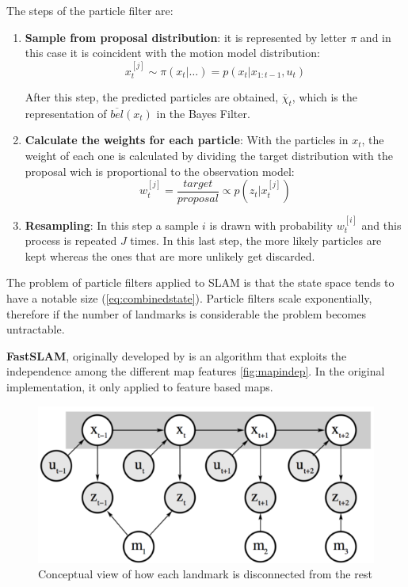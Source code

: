 The steps of the particle filter are:
\begin{enumerate}
  \item \textbf{Sample from proposal distribution}: it is represented by letter $\pi$ and in this case it is coincident with the motion model distribution:
  \begin{equation}
    x_t^{[j]} \sim \pi(x_t|\ldots) = p(x_t|x_{1:t-1}, u_t) 
    \label{eq:pfmotion}
  \end{equation}  

  After this step, the predicted particles are obtained, $\overline{\chi}_t$, which is the representation of $\overline{bel}(x_t)$ in the Bayes Filter.

  \item \textbf{Calculate the weights for each particle}: With the particles in $x_t$, the weight of each one is calculated by dividing the target distribution with the proposal wich is proportional to the observation model:
  \begin{equation}
    w_t^{[j]} = \frac{target}{proposal} \propto p(z_t|x_t^{[j]}) 
    \label{eq:pfobs}
  \end{equation}  

  \item \textbf{Resampling}: In this step a sample $i$ is drawn with probability $w_t^{[i]}$ and this process is repeated $J$ times. In this last step, the more likely particles are kept whereas the ones that are more unlikely get discarded.
\end{enumerate}  

The problem of particle filters applied to SLAM is that the state space tends to have a notable size (\autoref{eq:combinedstate}). Particle filters scale exponentially, therefore if the number of landmarks is considerable the problem becomes untractable. 

\textbf{FastSLAM}, originally developed by  is an algorithm that exploits the independence among the different map features \autoref{fig:mapindep}. In the original implementation, it only applied to feature based maps.
\begin{figure}[t]
  \centering
  \includegraphics[width=\linewidth]{pictures/03/mapindep}
  \caption[Landmarks are independent from each other]{Conceptual view of how each landmark is disconnected from the rest}
  \label{fig:mapindep}
\end{figure}  

